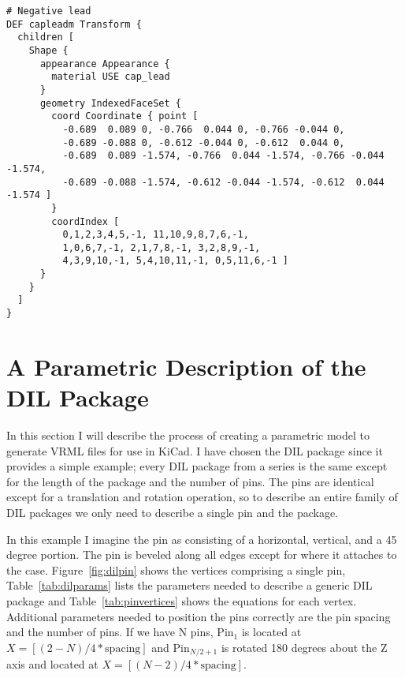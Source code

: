 \documentclass[a4paper]{article}
\begin{document}
\begin{verbatim}
# Negative lead
DEF capleadm Transform {
  children [
    Shape {
      appearance Appearance {
        material USE cap_lead
      }
      geometry IndexedFaceSet {
        coord Coordinate { point [
          -0.689  0.089 0, -0.766  0.044 0, -0.766 -0.044 0,
          -0.689 -0.088 0, -0.612 -0.044 0, -0.612  0.044 0,
          -0.689  0.089 -1.574, -0.766  0.044 -1.574, -0.766 -0.044 -1.574,
          -0.689 -0.088 -1.574, -0.612 -0.044 -1.574, -0.612  0.044 -1.574 ]
        }
        coordIndex [
          0,1,2,3,4,5,-1, 11,10,9,8,7,6,-1,
          1,0,6,7,-1, 2,1,7,8,-1, 3,2,8,9,-1,
          4,3,9,10,-1, 5,4,10,11,-1, 0,5,11,6,-1 ]
      }
    }
  ]
}
\end{verbatim}


\section{A Parametric Description of the DIL Package}
In this section I will describe the process of creating a parametric model to generate
VRML files for use in KiCad.  I have chosen the DIL package since it provides a simple
example; every DIL package from a series is the same except for the length of the package
and the number of pins. The pins are identical except for a translation and rotation
operation, so to describe an entire family of DIL packages we only need to describe a
single pin and the package.

 In this example I imagine the pin as consisting of a horizontal, vertical, and a 45 degree
 portion. The pin is beveled along all edges except for where it attaches to the case.
 Figure~\ref{fig:dilpin} shows the vertices comprising a single pin, Table~\ref{tab:dilparams}
 lists the parameters needed to describe a generic DIL package and Table~\ref{tab:pinvertices}
 shows the equations for each vertex. Additional parameters needed to position the pins
 correctly are the pin spacing and the number of pins. If we have N pins, $\mathrm{Pin}_1$
 is located at $X = [(2-N)/4*\mathrm{spacing}]$ and $\mathrm{Pin}_{N/2+1}$ is rotated 180 degrees
 about the Z axis and located at $X = [(N-2)/4*\mathrm{spacing}]$.
\end{document}
